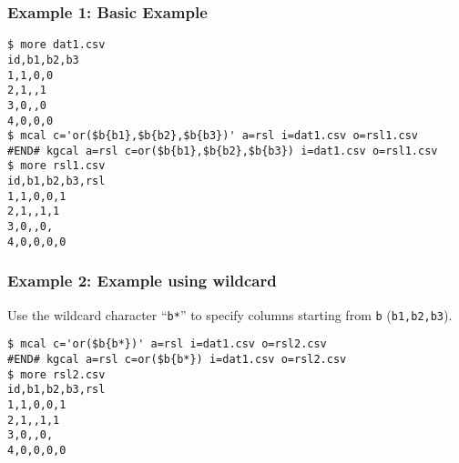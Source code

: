 \subsubsection*{Example 1: Basic Example}



\begin{Verbatim}[baselinestretch=0.7,frame=single]
$ more dat1.csv
id,b1,b2,b3
1,1,0,0
2,1,,1
3,0,,0
4,0,0,0
$ mcal c='or($b{b1},$b{b2},$b{b3})' a=rsl i=dat1.csv o=rsl1.csv
#END# kgcal a=rsl c=or($b{b1},$b{b2},$b{b3}) i=dat1.csv o=rsl1.csv
$ more rsl1.csv
id,b1,b2,b3,rsl
1,1,0,0,1
2,1,,1,1
3,0,,0,
4,0,0,0,0
\end{Verbatim}
\subsubsection*{Example 2: Example using wildcard }

Use the wildcard character “\verb|b*|” to specify columns starting from \verb|b| (\verb|b1,b2,b3|).


\begin{Verbatim}[baselinestretch=0.7,frame=single]
$ mcal c='or($b{b*})' a=rsl i=dat1.csv o=rsl2.csv
#END# kgcal a=rsl c=or($b{b*}) i=dat1.csv o=rsl2.csv
$ more rsl2.csv
id,b1,b2,b3,rsl
1,1,0,0,1
2,1,,1,1
3,0,,0,
4,0,0,0,0
\end{Verbatim}
